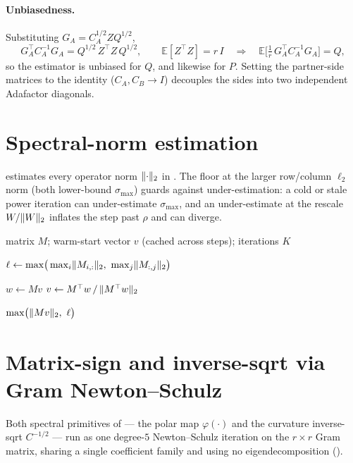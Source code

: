 \documentclass[11pt]{article}
\newcommand{\E}{\mathbb{E}}
\newcommand{\smax}{\sigma_{\max}}
\DeclarePairedDelimiter{\norm}{\lVert}{\rVert}
\newcommand{\polar}{\varphi}                 %
\theoremstyle{plain}
\theoremstyle{definition}
\theoremstyle{remark}
\begin{document}
\paragraph{Unbiasedness.} Substituting $G_A=C_A^{1/2}ZQ^{1/2}$,
\begin{equation*}
  G_A^\top C_A^{-1}G_A=Q^{1/2}\,Z^\top Z\,Q^{1/2},\qquad
  \E[Z^\top Z]=r\,I
  \quad\Longrightarrow\quad
  \E\!\big[\tfrac1r\,G_A^\top C_A^{-1}G_A\big]=Q,
\end{equation*}
so the estimator is unbiased for $Q$, and likewise for $P$. Setting the partner-side
matrices to the identity ($C_A,C_B\to I$) decouples the sides into two independent
Adafactor diagonals.

\section{Spectral-norm estimation}
\label{app:smax}
 estimates every operator norm $\norm{\cdot}_2$ in . The floor at the larger row/column $\ell_2$ norm (both lower-bound $\smax$) guards against under-estimation: a cold or stale power iteration can under-estimate $\smax$, and an under-estimate at the rescale $W/\norm{W}_2$ inflates the step past $\rho$ and can diverge.

\begin{algorithm}[h]
\caption{Guarded spectral-norm estimate $\smax(M)$}
\label{alg:smax}
\begin{algorithmic}[1]
\Require matrix $M$; warm-start vector $v$ (cached across steps); iterations $K$
\Statex

\State $\ell\gets\max\!\big(\max_i\norm{M_{i,:}}_2,\ \max_j\norm{M_{:,j}}_2\big)$
\Statex

 
  \State $w\gets Mv$
  \State $v\gets M^\top w \,/\, \norm{M^\top w}_2$
\EndFor
\Statex

\State \Return $\max\!\big(\norm{Mv}_2,\ \ell\big)$ 
\end{algorithmic}
\end{algorithm}

\section{Matrix-sign and inverse-sqrt via Gram Newton--Schulz}
\label{app:gramns}
Both spectral primitives of  --- the polar map $\polar(\cdot)$ and the
curvature inverse-sqrt $C^{-1/2}$ --- run as one degree-$5$ Newton--Schulz iteration on
the $r\times r$ Gram matrix, sharing a single coefficient family and using no
eigendecomposition ().
\end{document}
